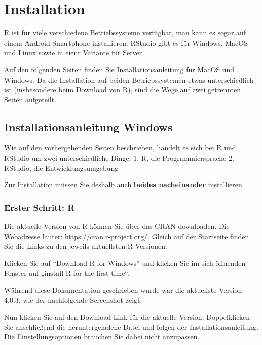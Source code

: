 \documentclass[
]{book}
\begin{document}
\hypertarget{installation}{%
\chapter{Installation}\label{installation}}

R ist für viele verschiedene Betriebssysteme verfügbar, man kann es sogar auf einem Android-Smartphone installieren. RStudio gibt es für Windows, MacOS und Linux sowie in eienr Variante für Server.

Auf den folgenden Seiten finden Sie Installationsanleitung für MacOS und Windows.
Da die Installation auf beiden Betriebssystemen etwas unterschiedlich ist (insbesondere beim Download von R), sind die Wege auf zwei getrennten Seiten aufgeteilt.

\hypertarget{installationsanleitung-windows}{%
\section{Installationsanleitung Windows}\label{installationsanleitung-windows}}

Wie auf den vorhergehenden Seiten beschrieben, handelt es sich bei R und RStudio um zwei unterschiedliche Dinge:
1. R, die Programmiersprache
2. RStudio, die Entwicklungsumgebung

Zur Installation müssen Sie deshalb auch \textbf{beides nacheinander} installieren.

\hypertarget{erster-schritt-r}{%
\subsection{Erster Schritt: R}\label{erster-schritt-r}}

Die aktuelle Version von R können Sie über das CRAN downloaden. Die Webadresse lautet: \href{https://cran.r-project.org}{https://cran.r-project.org/}. Gleich auf der Startseite finden Sie die Links zu den jeweils aktuellsten R-Versionen:

Klicken Sie auf ``Download R for Windows'' und klicken Sie im sich öffnenden Fenster auf „install R for the first time``.

Während diese Dokumentation geschrieben wurde war die aktuellste Version 4.0.3, wie der nachfolgende Screenshot zeigt:

Nun klicken Sie auf den Download-Link für die aktuelle Version. Doppelklicken Sie anschließend die heruntergeladene Datei und folgen der Installationsanleitung. Die Einstellungsoptionen brauchen Sie dabei nicht anzupassen.
\end{document}
